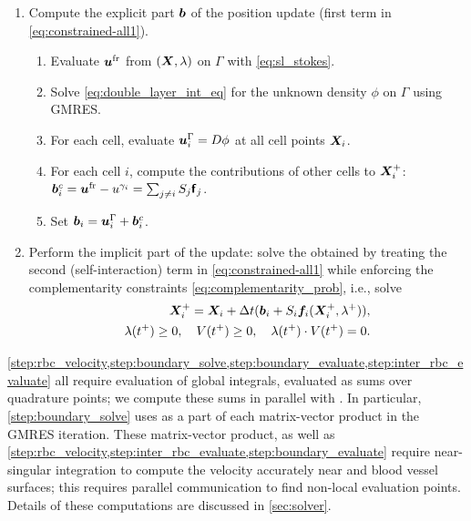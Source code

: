 \begin{enumerate}

\item
  Compute the explicit part $\bm{b}$ of the position update (first term in \cref{eq:constrained-all1}).
  \begin{enumerate}
  \item \label{step:rbc_velocity}
    Evaluate ${\bm{u}}^{\mathrm{fr}}$ from $({\bm{X}}, \lambda)$  on $\Gamma$  with
    \cref{eq:sl_stokes}.
  \item\label{step:boundary_solve} Solve \cref{eq:double_layer_int_eq} for the unknown density $\phi$ on $\Gamma$ using GMRES.
  \item\label{step:boundary_evaluate} For each cell, evaluate  ${\bm{u}}^\Gamma_i = D\phi$ at all cell points ${\bm{X}}_i$.
  \item\label{step:inter_rbc_evaluate} For each cell $i$, compute the contributions of
    other cells to ${\bm{X}}_i^+$:  $\bm{b}^c_i = {\bm{u}}^{\mathrm{fr}} - u^{\gamma_i} = \sum_{j\neq i}S_j\bm{\mathsf{f}}_j$. 
  \item Set $\bm{b}_i = {\bm{u}}^\Gamma_i + \bm{b}^c_i$.
  \end{enumerate}
  \item \label{step:solve_ncp} Perform the implicit part of the
    update: solve the \ncp obtained  by treating the second
    (self-interaction) term in \cref{eq:constrained-all1} while
    enforcing the complementarity constraints \cref{eq:complementarity_prob}, i.e., solve
    \begin{align}
      {\bm{X}}^+_i = {\bm{X}}_i + \Delta t (\bm{b}_i + S_i \bm{f}_i({\bm{X}}_i^+,\lambda^+)),\label{eq:ncp1}\\
      \lambda(t^+) \geq 0, \quad V(t^+) \geq 0, \quad \lambda(t^+) \cdot V(t^+) = 0.\label{eq:ncp2}
    \end{align}
\end{enumerate}

\cref{step:rbc_velocity,step:boundary_solve,step:boundary_evaluate,step:inter_rbc_evaluate}
all require evaluation of global integrals, evaluated as sums over quadrature points;
we compute these sums in parallel with \pvfmm. In particular,
\cref{step:boundary_solve} uses \pvfmm as a part of each matrix-vector product in the
GMRES iteration. These matrix-vector product,
as well as \cref{step:rbc_velocity,step:inter_rbc_evaluate,step:boundary_evaluate}
require near-singular integration to compute the velocity accurately
near \rbc and blood vessel surfaces; this requires parallel
communication to find non-local evaluation points.
Details of these computations are discussed
in \cref{sec:solver}.

